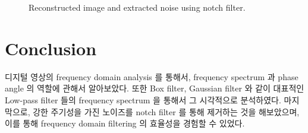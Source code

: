 \documentclass[a4paper, 12p]{paper}
\begin{document}
\begin{figure}[H]
{}
\caption{Reconstructed image and extracted noise using notch filter.}\label{fig:impl3_result}
\end{figure}

\section{Conclusion}
디지털 영상의 frequency domain analysis 를 통해서, frequency spectrum 과 phase angle 의 역할에 관해서 알아보았다. 또한 Box filter, Gaussian filter 와 같이 대표적인 Low-pass filter 들의 frequency spectrum 을 통해서 그 시각적으로 분석하였다. 마지막으로, 강한 주기성을 가진 노이즈를 notch filter 를 통해 제거하는 것을 해보았으며, 이를 통해 frequency domain filtering 의 효율성을 경험할 수 있었다.
\end{document}
